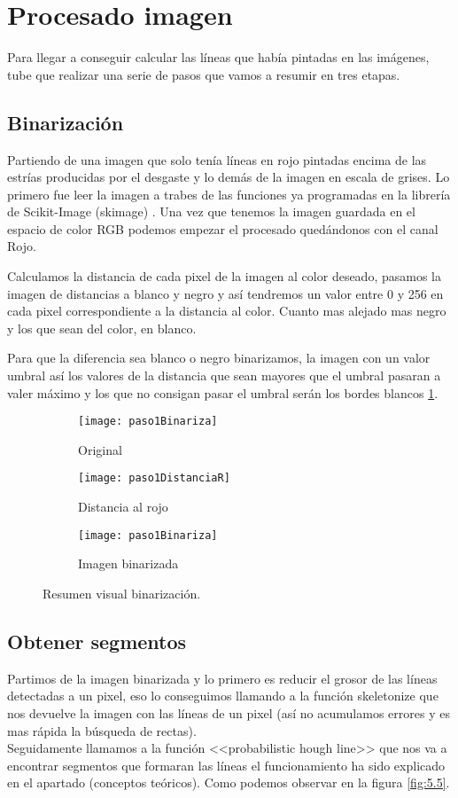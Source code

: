 \section{Procesado imagen}
Para llegar a conseguir calcular las líneas que había pintadas en las imágenes, tube que realizar una serie de pasos que vamos a resumir en tres etapas.
\subsection{Binarización}
Partiendo de una imagen que solo tenía líneas en rojo pintadas encima de las estrías producidas por el desgaste y lo demás de la imagen en escala de grises. Lo primero fue leer la imagen a trabes de las funciones ya programadas en la librería de Scikit-Image (skimage) \cite{scik:skeleton}.
Una vez que tenemos la imagen guardada en el espacio de color RGB podemos empezar el procesado quedándonos con el canal Rojo.

Calculamos la distancia de cada pixel de la imagen al color deseado, pasamos la imagen de distancias a blanco y negro y así tendremos un valor entre 0 y 256 en cada pixel correspondiente a la distancia al color. Cuanto mas alejado mas negro y los que sean del color, en blanco.

Para que la diferencia sea blanco o negro binarizamos, la imagen con un valor umbral así los valores de la distancia que sean mayores que el umbral pasaran a valer máximo y los que no consigan pasar el umbral serán los bordes blancos \ref{fig:5.4}.


\begin{figure}
\begin{subfigure}[c]{.5\linewidth}
\centering\large \texttt{[image: paso1Binariza]}
\caption{Original}
\end{subfigure}%
\begin{subfigure}[c]{.5\linewidth}
\centering\large \texttt{[image: paso1DistanciaR]}
\caption{Distancia al rojo}
\end{subfigure}
\begin{subfigure}[c]{.5\linewidth}
\centering\large \texttt{[image: paso1Binariza]}
\caption{Imagen binarizada}
\end{subfigure}
\caption{Resumen visual binarización.}\label{fig:5.4}
\end{figure}


\subsection{Obtener segmentos}
Partimos de la imagen binarizada y lo primero es reducir el grosor de las líneas detectadas a un pixel, eso lo conseguimos llamando a la función skeletonize que nos devuelve la imagen con las líneas de un pixel (así no acumulamos errores y es mas rápida la búsqueda de rectas).\\
Seguidamente llamamos a la función <<probabilistic hough line>> que nos va a encontrar segmentos que formaran las líneas el funcionamiento ha sido explicado en el apartado (conceptos teóricos). Como podemos observar en la figura \ref{fig:5.5}.


